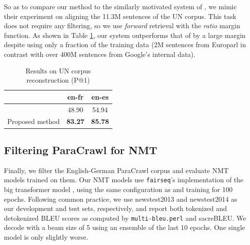 \documentclass[11pt,a4paper]{article}
\begin{document}
So as to compare our method to the similarly motivated system of \citet{guo:2018:wmt_effective}, we mimic their experiment on aligning the 11.3M sentences of the UN corpus. This task does not require any filtering, so we use \textit{forward} retrieval with the \textit{ratio} margin function. As shown in Table \ref{tab:results_un}, our system outperforms that of \citet{guo:2018:wmt_effective} by a large margin despite using only a fraction of the training data (2M sentences from Europarl in contrast with over 400M sentences from Google's internal data).


\begin{table}[t]
\begin{small}
\begin{center}
  \begin{tabular}{lcc}
    \toprule
    & \bf en-fr & \bf en-es \\
    \midrule
    \citet{guo:2018:wmt_effective} & 48.90 & 54.94 \\
    \midrule
    Proposed method & \bf 83.27 & \bf 85.78 \\
    \bottomrule
  \end{tabular}
\end{center}
\end{small}
\caption{Results on UN corpus reconstruction (P@1)}
\label{tab:results_un}
\end{table}


\subsection{Filtering ParaCrawl for NMT} \label{subsec:paracrawl}

Finally, we filter the English-German ParaCrawl corpus and evaluate NMT models trained on them. Our NMT models use \texttt{fairseq}'s implementation of the big transformer model \citep{vaswani2017attention}, using the same configuration as \citet{Ott:2018:wmt_scale_nmt} and training for 100 epochs. Following common practice, we use newstest2013 and newstest2014 as our development and test sets, respectively, and report both tokenized and detokenized BLEU scores as computed by \texttt{multi-bleu.perl} and sacreBLEU. %
We decode with a beam size of 5 using an ensemble of the last 10 epochs. One single model is only slightly worse.
\end{document}
